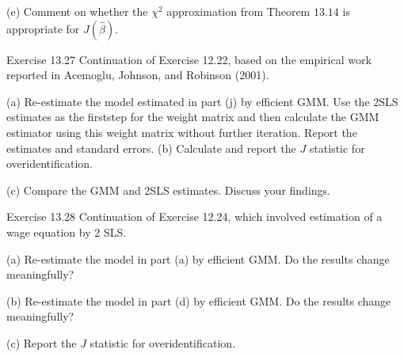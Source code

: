 \documentclass[10pt]{article}
\begin{document}
(e) Comment on whether the $\chi^{2}$ approximation from Theorem $13.14$ is appropriate for $J(\widehat{\beta})$.

Exercise 13.27 Continuation of Exercise 12.22, based on the empirical work reported in Acemoglu, Johnson, and Robinson (2001).

(a) Re-estimate the model estimated in part (j) by efficient GMM. Use the 2SLS estimates as the firststep for the weight matrix and then calculate the GMM estimator using this weight matrix without further iteration. Report the estimates and standard errors. (b) Calculate and report the $J$ statistic for overidentification.

(c) Compare the GMM and 2SLS estimates. Discuss your findings.

Exercise 13.28 Continuation of Exercise 12.24, which involved estimation of a wage equation by 2 SLS.

(a) Re-estimate the model in part (a) by efficient GMM. Do the results change meaningfully?

(b) Re-estimate the model in part (d) by efficient GMM. Do the results change meaningfully?

(c) Report the $J$ statistic for overidentification.
\end{document}
